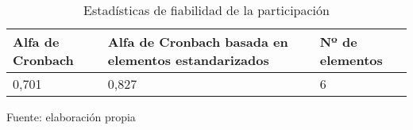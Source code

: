 \begin{table}[h]
    \caption {Estadísticas de fiabilidad de la participación}
	\label{tab:fiabilidadParticipacion}
	\setlength\extrarowheight{5pt}
	
	\begin{tabular}{p{5.7cm} p{4.6cm} p{2.8cm}}
	\toprule
	Alfa de Cronbach	& Alfa de Cronbach basada en elementos estandarizados	& Nº de elementos \\
	\midrule
	0,701				& 0,827					& 6 \\
	\bottomrule
	\end{tabular}
	
	\center
	\footnotesize
	Fuente: elaboración propia
\end{table}
